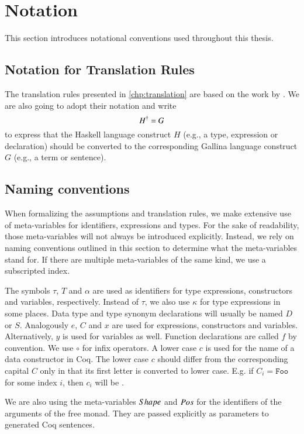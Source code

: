 \section{Notation} \label{sec:preliminaries:notation}
This section introduces notational conventions used throughout this thesis.

\subsection{Notation for Translation Rules} \label{sec:preliminaries:notation:rules}
The translation rules presented in \autoref{chp:translation} are based on the work by \cite{Abel:2005}.
We are also going to adopt their notation and write
\[
  {H}^{\dagger} = G
\]
to express that the Haskell language construct $H$ (e.g., a type, expression or declaration) should be converted to the corresponding Gallina language construct $G$ (e.g., a term or sentence).

\subsection{Naming conventions} \label{sec:preliminaries:notation:naming-conventions}
When formalizing the assumptions and translation rules, we make extensive use of meta-variables for identifiers, expressions and types.
For the sake of readability, those meta-variables will not always be introduced explicitly.
Instead, we rely on naming conventions outlined in this section to determine what the meta-variables stand for.
If there are multiple meta-variables of the same kind, we use a subscripted index.

The symbols $\tau$, $T$ and $\alpha$ are used as identifiers for type expressions, constructors and variables, respectively.
Instead of $\tau$, we also use $\kappa$ for type expressions in some places.
Data type and type synonym declarations will usually be named $D$ or $S$.
Analogously $e$, $C$ and $x$ are used for expressions, constructors and variables.
Alternatively, $y$ is used for variables as well.
Function declarations are called $f$ by convention.
We use $\circ$ for infix operators.
A lower case $c$ is used for the name of a data constructor in Coq.
The lower case $c$ should differ from the corresponding capital $C$ only in that its first letter is converted to lower case.
E.g. if $C_i = \texttt{Foo}$ for some index $i$, then $c_i$ will be .

We are also using the meta-variables $Shape$ and $Pos$ for the identifiers of the arguments of the free monad.
They are passed explicitly as parameters to generated Coq sentences.

